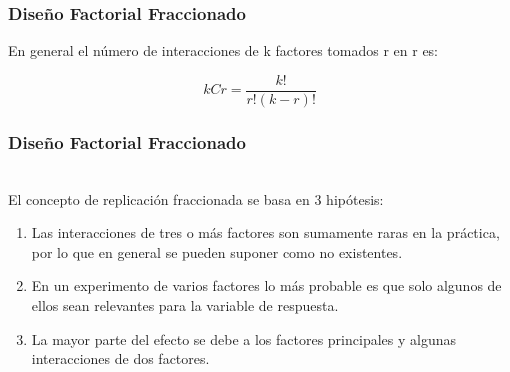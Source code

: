\documentclass[12pt]{beamer}
\begin{document}
\begin{frame}
\frametitle{Diseño Factorial Fraccionado}
\begin{table}[htbp]
  \centering
  \caption{No de factores del experimento}
  \label{tab:addlabel}%
\end{table}%
En general el número de interacciones de k factores tomados r en r es:

$$kCr=\frac{k!}{r!(k-r)!}$$
\end{frame}

\begin{frame}
\frametitle{Diseño Factorial Fraccionado}
~\\El concepto de replicación fraccionada se  basa en 3 hipótesis:

\begin{enumerate}[1.]
    \item Las interacciones de tres o más factores son sumamente raras en la práctica, por lo que en general se pueden suponer como no existentes.
    \item En un experimento de varios factores lo más probable es que solo algunos de ellos sean relevantes para la variable de respuesta.
    \item La mayor parte del efecto se debe a los factores principales y algunas interacciones de dos factores.
\end{enumerate}
\end{frame}
\end{document}
